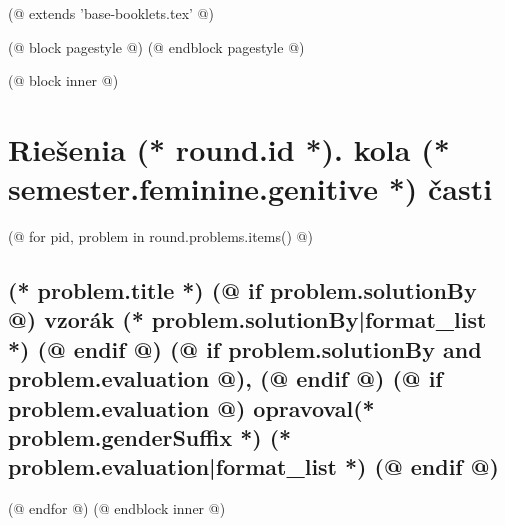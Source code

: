 (@ extends 'base-booklets.tex' @)

(@ block pagestyle @)
    \pagestyle{seminar-(* competition.id *)-(* volume.id *)-(* semester.id *)-(* round.id *)-solutions}
(@ endblock pagestyle @)

(@ block inner @)
    \section{\texorpdfstring{Riešenia (* round.id *). kola (* semester.feminine.genitive *) časti}{Riešenia}}

    (@ for pid, problem in round.problems.items() @)%
        \setcounter{volume}{(* volume.number *)}%
        \setcounter{semester}{(* semester.number *)}%
        \setcounter{round}{(* round.number *)}%
        \setcounter{problem}{(* problem.number *)}%

        \subsection{%
            \texorpdfstring{%
                \large \textbf{(* problem.title *)} \hfill \normalsize%
                (@ if problem.solutionBy @)%
                    vzorák (* problem.solutionBy|format_list *)%
                (@ endif @)%
                (@ if problem.solutionBy and problem.evaluation @), (@ endif @)%
                (@ if problem.evaluation @)%
                    opravoval(* problem.genderSuffix *) (* problem.evaluation|format_list *)%
                (@ endif @)%
            }{(* round.number *).(* problem.number *) (* problem.title *)}%
        }

    (@ endfor @)
(@ endblock inner @)
